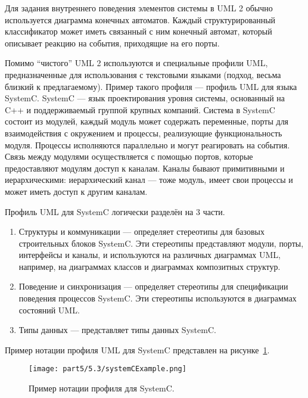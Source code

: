Для задания внутреннего поведения элементов системы в UML 2 обычно используется диаграмма 
конечных автоматов. Каждый структурированный классификатор может иметь связанный с 
ним конечный автомат, который описывает реакцию на события, приходящие на его порты.

Помимо "`чистого"' UML 2 используются и специальные профили UML, предназначенные для 
использования с текстовыми языками (подход, весьма близкий к предлагаемому). Пример 
такого профиля --- 
профиль UML для языка SystemC. SystemC
--- язык проектирования уровня системы, основанный на C++ и поддерживаемый группой крупных компаний. 
Система в SystemC состоит из модулей, каждый модуль может содержать переменные, порты 
для взаимодействия с окружением и процессы, реализующие функциональность модуля. Процессы
исполняются параллельно и могут реагировать на события. Связь между модулями осуществляется 
с помощью портов, которые предоставляют модулям доступ к каналам. Каналы бывают примитивными 
и иерархическими: иерархический канал --- тоже модуль, имеет свои процессы и может иметь 
доступ к другим каналам.

Профиль UML для SystemC логически разделён на 3 части.
\begin{enumerate}
	\item Структуры и коммуникации --- определяет стереотипы для базовых строительных 
		блоков SystemC. Эти стереотипы представляют модули, порты, интерфейсы и каналы, 
		и используются на различных диаграммах UML, например, на диаграммах классов и 
		диаграммах композитных структур.
	\item Поведение и синхронизация --- определяет стереотипы для спецификации поведения 
		процессов SystemC. Эти стереотипы используются в диаграммах состояний UML.
	\item Типы данных --- представляет типы данных SystemC.
\end{enumerate}

Пример нотации профиля UML для SystemC представлен на рисунке~\ref{image:systemCExample}.

\begin{figure} [ht]
	\begin{center}
		\texttt{[image: part5/5.3/systemCExample.png]}
		\caption{Пример нотации профиля для SystemC.}
		\label{image:systemCExample}
	\end{center}
\end{figure}

